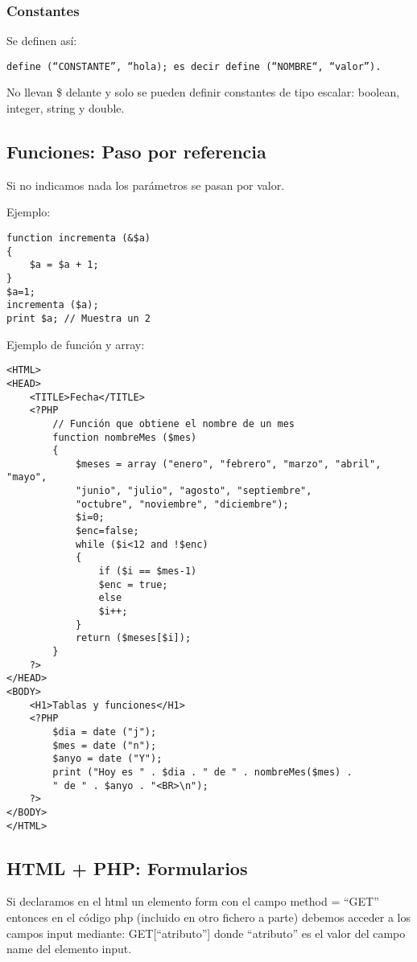 \documentclass{apuntes}
\begin{document}
\subsubsection{Constantes}
Se definen así:
\begin{verbatim}
define (“CONSTANTE”, “hola); es decir define (“NOMBRE“, “valor”).
\end{verbatim}
No llevan \$ delante y solo se pueden definir constantes de tipo escalar: boolean, integer, string y double.

\subsection{Funciones: Paso por referencia}
Si no indicamos nada los parámetros se pasan por valor.

Ejemplo:
\begin{verbatim}
function incrementa (&$a)
{
    $a = $a + 1;
}
$a=1;
incrementa ($a);
print $a; // Muestra un 2
\end{verbatim}

Ejemplo de función y array:

\begin{verbatim}
<HTML>
<HEAD>
    <TITLE>Fecha</TITLE>
    <?PHP
        // Función que obtiene el nombre de un mes
        function nombreMes ($mes)
        {
            $meses = array ("enero", "febrero", "marzo", "abril", "mayo",
            "junio", "julio", "agosto", "septiembre",
            "octubre", "noviembre", "diciembre");
            $i=0;
            $enc=false;
            while ($i<12 and !$enc)
            {
                if ($i == $mes-1)
                $enc = true;
                else
                $i++;
            }
            return ($meses[$i]);
        }
    ?>
</HEAD>
<BODY>
    <H1>Tablas y funciones</H1>
    <?PHP
        $dia = date ("j");
        $mes = date ("n");
        $anyo = date ("Y");
        print ("Hoy es " . $dia . " de " . nombreMes($mes) .
        " de " . $anyo . "<BR>\n");
    ?>
</BODY>
</HTML>
\end{verbatim}

\subsection{HTML + PHP: Formularios}
Si declaramos en el html un elemento form con el campo method = “GET” entonces en el código php (incluido en otro fichero a parte) debemos acceder a los campos input mediante: GET[“atributo”] donde “atributo” es el valor del campo name del elemento input.
\end{document}
